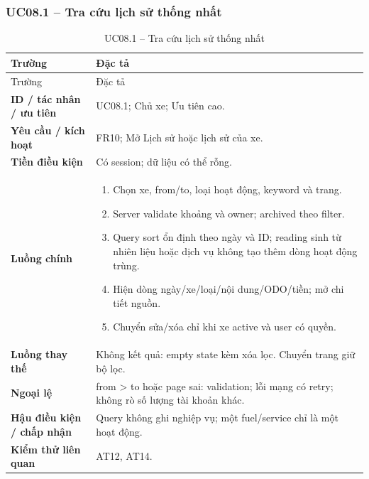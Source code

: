 \subsubsection{UC08.1 -- Tra cứu lịch sử thống nhất}\label{uc:UC08.1}
\begin{smalltable}\begin{longtable}{L{3.2cm}L{11.8cm}}
\caption{UC08.1 -- Tra cứu lịch sử thống nhất}\label{tab:UC08.1}\\
\toprule Trường & Đặc tả\\\midrule\endfirsthead
\toprule Trường & Đặc tả\\\midrule\endhead
\textbf{ID / tác nhân / ưu tiên} & UC08.1; Chủ xe; Ưu tiên cao.\\
\textbf{Yêu cầu / kích hoạt} & FR10; Mở Lịch sử hoặc lịch sử của xe.\\
\textbf{Tiền điều kiện} & Có session; dữ liệu có thể rỗng.\\
\textbf{Luồng chính} & \begin{enumerate}[leftmargin=*,nosep]
\item Chọn xe, from/to, loại hoạt động, keyword và trang.
\item Server validate khoảng và owner; archived theo filter.
\item Query sort ổn định theo ngày và ID; reading sinh từ nhiên liệu hoặc dịch vụ không tạo thêm dòng hoạt động trùng.
\item Hiện dòng ngày/xe/loại/nội dung/ODO/tiền; mở chi tiết nguồn.
\item Chuyển sửa/xóa chỉ khi xe active và user có quyền.
\end{enumerate}\\
\textbf{Luồng thay thế} & Không kết quả: empty state kèm xóa lọc. Chuyển trang giữ bộ lọc.\\
\textbf{Ngoại lệ} & from > to hoặc page sai: validation; lỗi mạng có retry; không rò số lượng tài khoản khác.\\
\textbf{Hậu điều kiện / chấp nhận} & Query không ghi nghiệp vụ; một fuel/service chỉ là một hoạt động.\\
\textbf{Kiểm thử liên quan} & AT12, AT14.\\
\bottomrule\end{longtable}\end{smalltable}
